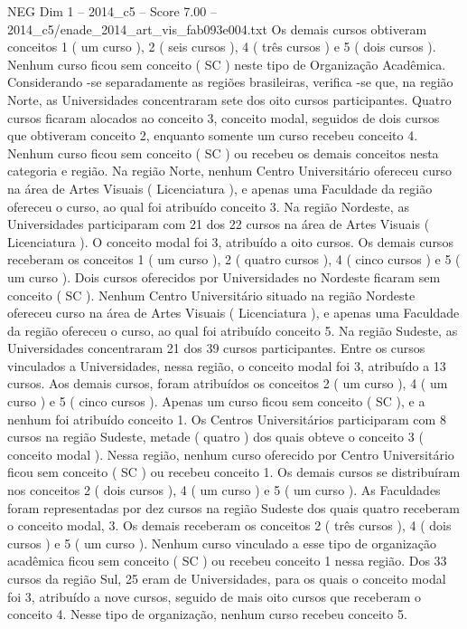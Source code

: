 \begin{textsample}{NEG Dim 1 – 2014\_c5 – Score 7.00 – 2014\_c5/enade\_2014\_art\_vis\_fab093e004.txt}
Os demais cursos obtiveram conceitos 1 ( um curso ), 2 ( seis cursos ), 4 ( três cursos ) e 5 ( dois cursos ).
Nenhum curso ficou sem conceito ( SC ) neste tipo de Organização Acadêmica.
Considerando -se separadamente as regiões brasileiras, verifica -se que, na região Norte, as Universidades concentraram sete dos oito cursos participantes.
Quatro cursos ficaram alocados ao conceito 3, conceito modal, seguidos de dois cursos que obtiveram conceito 2, enquanto somente um curso recebeu conceito 4.
Nenhum curso ficou sem conceito ( SC ) ou recebeu os demais conceitos nesta categoria e região.
Na região Norte, nenhum Centro Universitário ofereceu curso na área de Artes Visuais ( Licenciatura ), e apenas uma Faculdade da região ofereceu o curso, ao qual foi atribuído conceito 3.
Na região Nordeste, as Universidades participaram com 21 dos 22 cursos na área de Artes Visuais ( Licenciatura ).
O conceito modal foi 3, atribuído a oito cursos.
Os demais cursos receberam os conceitos 1 ( um curso ), 2 ( quatro cursos ), 4 ( cinco cursos ) e 5 ( um curso ).
Dois cursos oferecidos por Universidades no Nordeste ficaram sem conceito ( SC ).
Nenhum Centro Universitário situado na região Nordeste ofereceu curso na área de Artes Visuais ( Licenciatura ), e apenas uma Faculdade da região ofereceu o curso, ao qual foi atribuído conceito 5.
Na região Sudeste, as Universidades concentraram 21 dos 39 cursos participantes.
Entre os cursos vinculados a Universidades, nessa região, o conceito modal foi 3, atribuído a 13 cursos.
Aos demais cursos, foram atribuídos os conceitos 2 ( um curso ), 4 ( um curso ) e 5 ( cinco cursos ).
Apenas um curso ficou sem conceito ( SC ), e a nenhum foi atribuído conceito 1.
Os Centros Universitários participaram com 8 cursos na região Sudeste, metade ( quatro ) dos quais obteve o conceito 3 ( conceito modal ).
Nessa região, nenhum curso oferecido por Centro Universitário ficou sem conceito ( SC ) ou recebeu conceito 1.
Os demais cursos se distribuíram nos conceitos 2 ( dois cursos ), 4 ( um curso ) e 5 ( um curso ).
As Faculdades foram representadas por dez cursos na região Sudeste dos quais quatro receberam o conceito modal, 3.
Os demais receberam os conceitos 2 ( três cursos ), 4 ( dois cursos ) e 5 ( um curso ).
Nenhum curso vinculado a esse tipo de organização acadêmica ficou sem conceito ( SC ) ou recebeu conceito 1 nessa região.
Dos 33 cursos da região Sul, 25 eram de Universidades, para os quais o conceito modal foi 3, atribuído a nove cursos, seguido de mais oito cursos que receberam o conceito 4.
Nesse tipo de organização, nenhum curso recebeu conceito 5.

\end{textsample}
